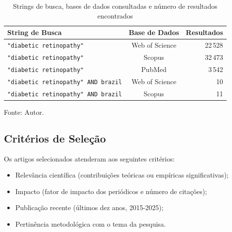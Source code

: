 \begin{table}[ht]
  \centering
  \caption{Strings de busca, bases de dados consultadas e número de resultados encontrados}
  \label{tab:grade-completa}
  \begin{tabular}{@{} l c r @{}}
    \toprule
    \textbf{String de Busca} & \textbf{Base de Dados} & \textbf{Resultados} \\ 
    \midrule
    \texttt{"diabetic retinopathy"}                     & Web of Science & 22\,528 \\ 
    \texttt{"diabetic retinopathy"}                     & Scopus         & 32\,473 \\ 
    \texttt{"diabetic retinopathy"}                     & PubMed         &  3\,542 \\ 
    \texttt{"diabetic retinopathy" AND brazil}          & Web of Science &     10 \\ 
    \texttt{"diabetic retinopathy" AND brazil}          & Scopus         &     11 \\ 
    \bottomrule
  \end{tabular}
\end{table}
\begin{flushleft}
  \small Fonte: Autor.
\end{flushleft}

\subsection{Critérios de Seleção}
\label{ssec:criterios-selecao}

Os artigos selecionados atenderam aos seguintes critérios:
\begin{itemize}
  \item Relevância científica (contribuições teóricas ou empíricas significativas);
  \item Impacto (fator de impacto dos periódicos e número de citações);
  \item Publicação recente (últimos dez anos, 2015-2025);
  \item Pertinência metodológica com o tema da pesquisa.
\end{itemize}